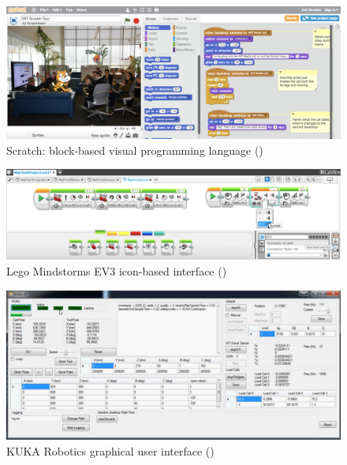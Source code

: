 \begin{figure}[h]
	\centering
	\includegraphics[width=\linewidth]{figures/scratch-interface}
	\caption{Scratch: block-based visual programming language (\cite{majed2014learn})}
	\label{fig:scratch-interface}
\end{figure} 

\begin{figure}[!h]
	\centering
	\includegraphics[width=\linewidth]{figures/lego-mindstorm2}
	\caption{Lego Mindstorms EV3 icon-based interface (\cite{lego2003})}
	\label{fig:lego-mindstorm}
\end{figure} 
\begin{figure}[!h]
	\centering
	\includegraphics[width=\linewidth]{figures/kuka-interface2}
	\caption{KUKA Robotics graphical user interface (\cite{kuka2006})}
	\label{fig:Kuka}
\end{figure} 


